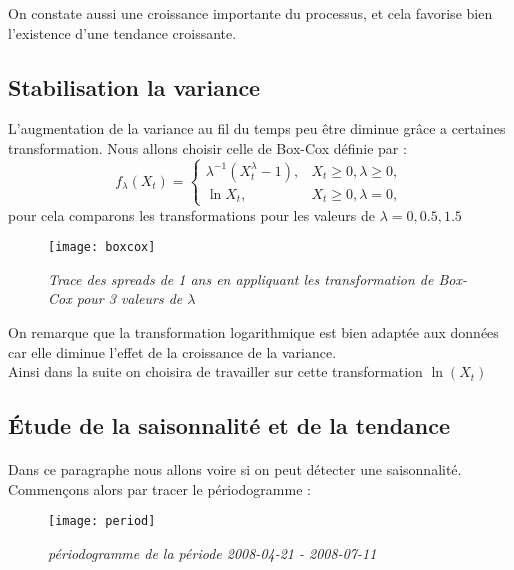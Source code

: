     On constate aussi une croissance importante du processus, et cela favorise bien
    l'existence d'une tendance croissante.

    \subsection{Stabilisation la variance}
        L'augmentation de la variance au fil du temps peu être diminue grâce a
        certaines transformation. Nous allons choisir celle  de Box-Cox définie par :
        \[
            f_\lambda(X_t)=
            \begin{cases}
                \lambda^{-1}(X_t^\lambda - 1), & X_t \geq 0,\lambda \ge 0, \\
                \ln X_t,                       & X_t \ge  0,\lambda  =   0,
            \end{cases}
        \]
        pour cela comparons les transformations pour les valeurs de
        $\lambda=0,0.5,1.5$
        \begin{figure}[H]
            \centering 
            \label{fig:Boxcox} 
            \texttt{[image: boxcox]} 
            \caption{\it Trace des spreads de 1 ans en appliquant les
            transformation de Box-Cox pour 3 valeurs de $\lambda$ } 
        \end{figure} 
        On remarque que la transformation logarithmique est bien adaptée  aux
        données car elle diminue l'effet de la croissance de la variance.\\
        Ainsi dans la suite on choisira de travailler sur cette transformation
        $\ln(X_t)$


        \subsection{Étude de la saisonnalité et de la tendance}

    \paragraph{}Dans ce paragraphe nous allons voire si on peut détecter une saisonnalité.
    Commençons alors par tracer le périodogramme :
    \begin{figure}[h]
        \centering 
        \label{fig:period} 
        \texttt{[image: period]} 
        \caption{\it périodogramme de la période 2008-04-21 - 2008-07-11 } 
    \end{figure} 

